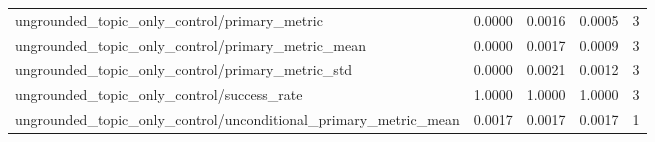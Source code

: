 \begin{table}[h]
\begin{tabular}{lrrrr}
ungrounded_topic_only_control/primary_metric & 0.0000 & 0.0016 & 0.0005 & 3 \\
ungrounded_topic_only_control/primary_metric_mean & 0.0000 & 0.0017 & 0.0009 & 3 \\
ungrounded_topic_only_control/primary_metric_std & 0.0000 & 0.0021 & 0.0012 & 3 \\
ungrounded_topic_only_control/success_rate & 1.0000 & 1.0000 & 1.0000 & 3 \\
ungrounded_topic_only_control/unconditional_primary_metric_mean & 0.0017 & 0.0017 & 0.0017 & 1 \\
\hline
\end{tabular}
\end{table}